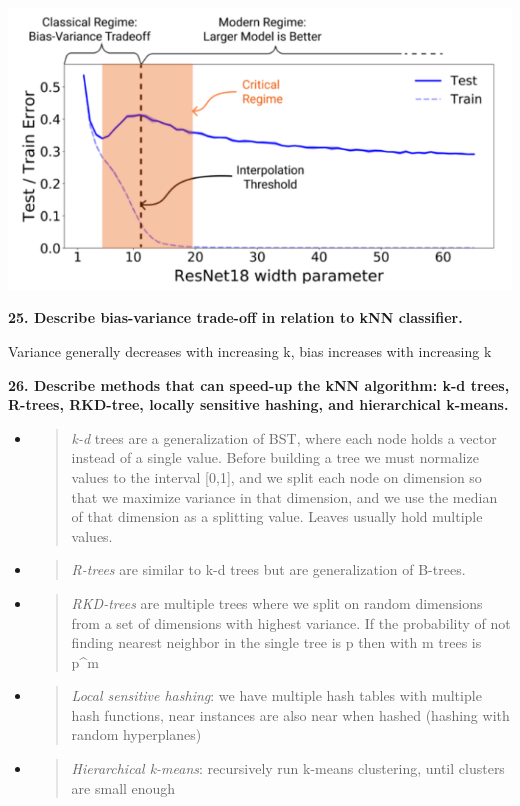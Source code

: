 \includegraphics[width=\columnwidth]{media/image24.png}

\textbf{25. Describe bias-variance trade-off in relation to kNN
classifier.}

Variance generally decreases with increasing k, bias increases with
increasing k

\textbf{26. Describe methods that can speed-up the kNN algorithm: k-d
trees, R-trees, RKD-tree, locally sensitive hashing, and hierarchical
k-means.}

\begin{itemize}
\item
  \begin{quote}
  \textit{k-d} trees are a generalization of BST, where each node
  holds a vector instead of a single value. Before building a tree we
  must normalize values to the interval {[}0,1{]}, and we split each
  node on dimension so that we maximize variance in that dimension, and
  we use the median of that dimension as a splitting value. Leaves
  usually hold multiple values.
  \end{quote}
\item
  \begin{quote}
  \textit{R-trees} are similar to k-d trees but are generalization of
  B-trees.
  \end{quote}
\item
  \begin{quote}
  \textit{RKD-trees} are multiple trees where we split on random
  dimensions from a set of dimensions with highest variance. If the
  probability of not finding nearest neighbor in the single tree is p
  then with m trees is p\^{}m
  \end{quote}
\item
  \begin{quote}
  \textit{Local sensitive hashing}: we have multiple hash tables with
  multiple hash functions, near instances are also near when hashed
  (hashing with random hyperplanes)
  \end{quote}
\item
  \begin{quote}
  \textit{Hierarchical k-means}: recursively run k-means clustering,
  until clusters are small enough
  \end{quote}
\end{itemize}

